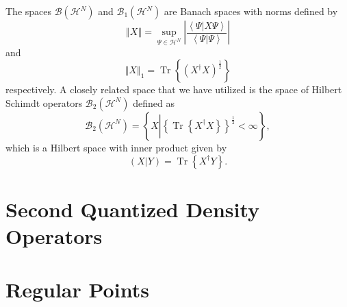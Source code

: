 \documentclass[aps,preprint]{revtex4}%
\begin{document}
The spaces $\mathcal{B}\left(  \mathcal{H}^{N}\right)  $ and $\mathcal{B}%
_{1}\left(  \mathcal{H}^{N}\right)  $ are Banach spaces with norms defined by
\begin{equation}
\left\Vert X\right\Vert =\sup_{\Psi\in\mathcal{H}^{N}}\left\vert
\frac{\left\langle \Psi\left\vert X\Psi\right.  \right\rangle }{\left\langle
\Psi\left\vert \Psi\right.  \right\rangle }\right\vert
\end{equation}
and
\begin{equation}
\left\Vert X\right\Vert _{1}=\operatorname{Tr}\left\{  \left(  X^{\dagger
}X\right)  ^{\frac{1}{2}}\right\}
\end{equation}
respectively. A closely related space that we have utilized is the space of
Hilbert Schimdt operators $\mathcal{B}_{2}\left(  \mathcal{H}^{N}\right)  $
defined as
\begin{equation}
\mathcal{B}_{2}\left(  \mathcal{H}^{N}\right)  =\left\{  X\left\vert \left\{
\operatorname{Tr}\left\{  X^{\dagger}X\right\}  \right\}  ^{\frac{1}{2}%
}<\infty\right.  \right\}  ,
\end{equation}
which is a Hilbert space with inner product given by
\begin{equation}
\left(  X\left\vert Y\right.  \right)  =\operatorname{Tr}\left\{  X^{\dagger
}Y\right\}  .
\end{equation}


\section{Second Quantized Density Operators \label{SecQuant}}

\section{Regular Points \label{Regular}}
\end{document}
